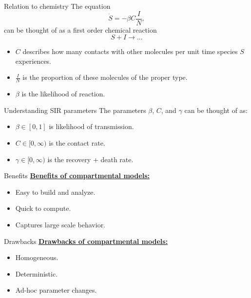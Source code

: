 \documentclass[aspectratio=169]{beamer}
\begin{document}
\begin{frame}{Relation to chemistry}
\vfill
    The equation
    \[
    \dot{S} = -\beta C \frac{I}{N},
    \]
    can be thought of as a first order chemical reaction
    \[
    S + I \to ...
    \]
    \pause
    \begin{itemize}  
        \item $C$ describes how many contacts with other molecules per unit time species $S$ experiences.
        \pause
        \item $\frac{I}{N}$ is the proportion of these molecules of the proper type.
        \pause
        \item $\beta$ is the likelihood of reaction.
    \end{itemize}
\vfill    
\end{frame}

\begin{frame}{Understanding SIR parameters}
    \vfill
    \pause
    The parameters $\beta$, $C$, and $\gamma$ can be thought of as:
    \begin{itemize}
    \pause
        \item $\beta \in [0,1]$ is likelihood of transmission.
        \pause
        \item $C \in [0,\infty)$ is the contact rate.
        \pause
        \item $\gamma \in [0,\infty)$ is the recovery + death rate.
    \end{itemize}
    \vfill
\end{frame}

\begin{frame}{Benefits}
    \vfill
    \textbf{\underline{Benefits of compartmental models:}}
    \begin{itemize}
        \pause
        \item Easy to build and analyze.
        \pause
        \item Quick to compute.
        \pause
        \item Captures large scale behavior.
    \end{itemize}
    \vfill
\end{frame}

\begin{frame}{Drawbacks}
    \vfill
    \textbf{\underline{Drawbacks of compartmental models:}}
    \begin{itemize}
        \pause
        \item Homogeneous.
        \pause
        \item Deterministic.
        \pause
        \item Ad-hoc parameter changes.
    \end{itemize}
    \vfill
\end{frame}
\end{document}
